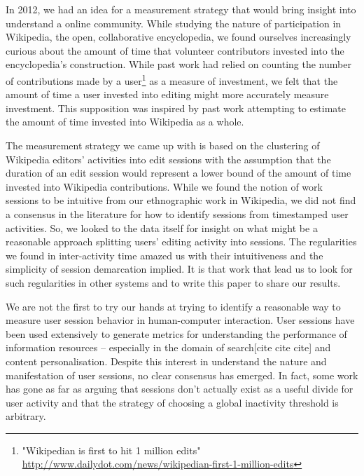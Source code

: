 In 2012, we had an idea for a measurement strategy that would bring insight into understand a online community.  While studying the nature of participation in Wikipedia, the open, collaborative encyclopedia, we found ourselves increasingly curious about the amount of time that volunteer contributors invested into the encyclopedia's construction.  While past work had relied on counting the number of contributions made by a user\footnote{"Wikipedian is first to hit 1 million edits" \url{http://www.dailydot.com/news/wikipedian-first-1-million-edits}} as a measure of investment, we felt that the amount of time a user invested into editing might more accurately measure investment.  This supposition was inspired by past work attempting to estimate the amount of time invested into Wikipedia as a whole\cite{clay shirky's 100 million hours}.

The measurement strategy we came up with is based on the clustering of Wikipedia editors' activities into edit sessions with the assumption that the duration of an edit session would represent a lower bound of the amount of time invested into Wikipedia contributions\cite{geiger13using}.  While we found the notion of work sessions to be intuitive from our ethnographic work in Wikipedia, we did not find a consensus in the literature for how to identify sessions from timestamped user activities.  So, we looked to the data itself for insight on what might be a reasonable approach splitting users' editing activity into sessions. The regularities we found in inter-activity time amazed us with their intuitiveness and the simplicity of session demarcation implied. It is that work that lead us to look for such regularities in other systems and to write this paper to share our results.

We are not the first to try our hands at trying to identify a reasonable way to measure user session behavior in human-computer interaction.  User sessions have been used extensively to generate metrics for understanding the performance of information resources\cite{govseva2006empirical} -- especially in the domain of search[cite cite cite] and content personalisation\cite{spiliopoulou2003framework,gomory1999analysis}. Despite this interest in understand the nature and manifestation of user sessions, no clear consensus has emerged.  In fact, some work has gone as far as arguing that sessions don't actually exist as a useful divide for user activity\cite{jones2008beyond} and that the strategy of choosing a global inactivity threshold is arbitrary\cite{montgomery2001identifying}.

